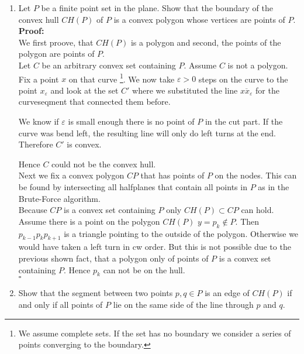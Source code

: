 \documentclass[11pt,a4paper,ngerman]{article}
\begin{document}
\begin{description}
\begin{enumerate}
    \item Let $P$ be a finite point set in the plane.
          Show that the boundary of the convex hull $CH(P)$ of $P$ is a convex polygon
          whose vertices are points of $P$. \\

	 \textbf{Proof:}\\
	 We first proove, that $CH(P)$ is a polygon and second, the 
	 points of the polygon are points of $P$.\\

   	 Let $C$ be an arbitrary convex set containing $P$. Assume $C$ is
	not a polygon. Fix a point $x$ on that curve 
	\footnote{We assume complete sets. If the set has no boundary
	we consider a series of points converging to the boundary.}.
	We now take $\varepsilon > 0$ steps on the curve to the point
	$x_\varepsilon$ and look at the 
	set $C'$ where we substituted the line $\overline{xx_\varepsilon}$
	for the curveseqment that connected them before.

	We know if $\varepsilon$ is small enough there is no point of $P$
	in the cut part. If the curve was bend left, the resulting line will
	only do left turns at the end. Therefore $C'$ is convex.

	Hence $C$ could not be the convex hull.\\

	Next we fix a convex polygon $CP$ that has points of $P$ on the
	nodes. This can be found by intersecting all halfplanes that contain all
	points in $P$ as in the Brute-Force algorithm.\\

	Because $CP$ is a convex set containing $P$ only 
	$CH(P) \subset CP$ can hold.\\

	Assume there is a point on the polygon $CH(P)$ $y=p_k \not \in P$.
	Then $p_{k-1}p_kp_{k+1}$ is a triangle pointing to the outside
	of the polygon. Otherwise we would have taken a left turn in cw
	order.
	But this is not possible due to the previous shown fact, that
	a polygon only of points of $P$ is a convex set containing $P$.
	Hence $p_k$ can not be on the hull.\\
\mbox{}\hfill$\square$

    \item Show that the segment between two points $p, q \in P$ is an edge of $CH(P)$ if
          and only if all points of $P$ lie on the same side of the line through $p$ and $q$. \\


\end{enumerate}
\end{description}
\end{document}
